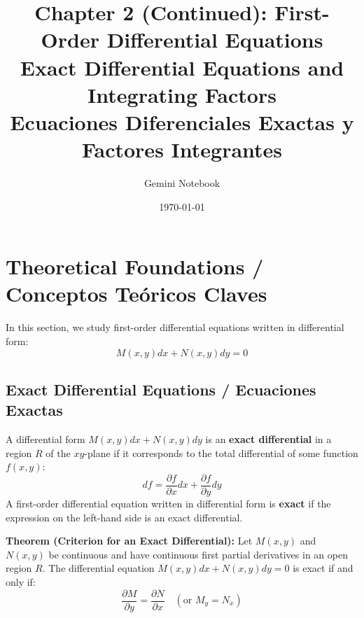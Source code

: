 \documentclass[11pt,letterpaper]{article}
\title{\textbf{Chapter 2 (Continued): First-Order Differential Equations}\\
\large Exact Differential Equations and Integrating Factors\\
\normalsize Ecuaciones Diferenciales Exactas y Factores Integrantes}
\author{Gemini Notebook}
\date{\today}
\begin{document}
\maketitle

\section{Theoretical Foundations / Conceptos Teóricos Claves}

In this section, we study first-order differential equations written in differential form:
\begin{equation}
    M(x,y)dx + N(x,y)dy = 0
\end{equation}

\subsection{Exact Differential Equations / Ecuaciones Exactas}
A differential form $M(x,y)dx + N(x,y)dy$ is an \textbf{exact differential} in a region $R$ of the $xy$-plane if it corresponds to the total differential of some function $f(x,y)$:
\begin{equation}
    df = \frac{\partial f}{\partial x}dx + \frac{\partial f}{\partial y}dy
    \label{eq:total_diff}
\end{equation}
A first-order differential equation written in differential form is \textbf{exact} if the expression on the left-hand side is an exact differential.

\textbf{Theorem (Criterion for an Exact Differential):}
Let $M(x,y)$ and $N(x,y)$ be continuous and have continuous first partial derivatives in an open region $R$. The differential equation $M(x,y)dx + N(x,y)dy = 0$ is exact if and only if:
\begin{equation}
    \frac{\partial M}{\partial y} = \frac{\partial N}{\partial x} \quad (\text{or } M_y = N_x)
\end{equation}
\end{document}
